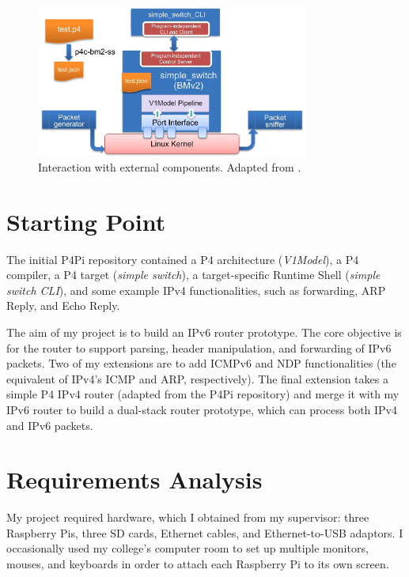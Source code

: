 \begin{figure}[htbp]
  \centering
    \includegraphics[width=0.8\textwidth]{figures/preparation/overview.jpg}
     \caption{Interaction with external components. Adapted from \cite{P4LangTutorial}.}
     \label{fig:prep-overview}
\end{figure}




\section{Starting Point}
\label{sec:2.5}
The initial P4Pi repository contained a P4 architecture (\textit{V1Model}), a P4 compiler, a P4 target (\textit{simple switch}), a target-specific Runtime Shell (\textit{simple switch CLI}), and some example IPv4 functionalities, such as forwarding, ARP Reply, and Echo Reply.

The aim of my project is to build an IPv6 router prototype. The core objective is for the router to support parsing, header manipulation, and forwarding of IPv6 packets. Two of my extensions are to add ICMPv6 and NDP functionalities (the equivalent of IPv4’s ICMP and ARP, respectively). The final extension takes a simple P4 IPv4 router (adapted from the P4Pi repository) and merge it with my IPv6 router to build a dual-stack router prototype, which can process both IPv4 and IPv6 packets.



\section{Requirements Analysis}
\label{sec:2.6}

My project required hardware, which I obtained from my supervisor: three Raspberry Pis, three SD cards, Ethernet cables, and Ethernet-to-USB adaptors. I occasionally used my college's computer room to set up multiple monitors, mouses, and keyboards in order to attach each Raspberry Pi to its own screen.

